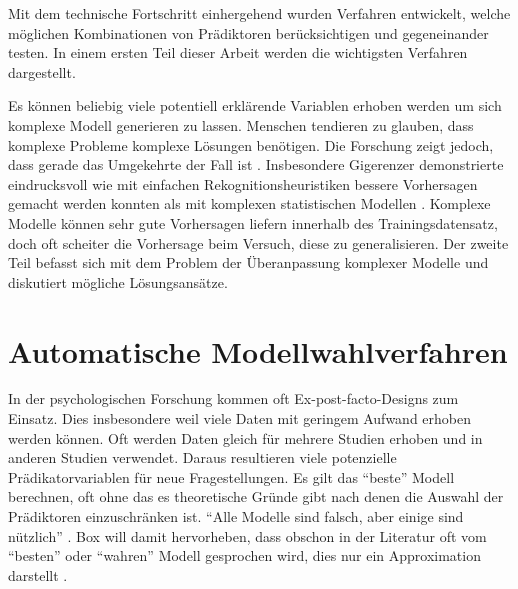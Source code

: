 \documentclass[english,12pt,doc]{apa}
\begin{document}
Mit dem technische Fortschritt einhergehend wurden Verfahren entwickelt, welche möglichen Kombinationen von Prädiktoren berücksichtigen und gegeneinander testen. 
In einem ersten Teil dieser Arbeit werden die wichtigsten Verfahren dargestellt. 

Es können beliebig viele potentiell erklärende Variablen erhoben werden um sich komplexe Modell generieren zu lassen. 
Menschen tendieren zu glauben, dass komplexe Probleme komplexe Lösungen benötigen. 
Die Forschung zeigt jedoch, dass gerade das Umgekehrte der Fall ist \cite[p.3]{armstrong2011illusions}. 
Insbesondere Gigerenzer demonstrierte eindrucksvoll wie mit einfachen Rekognitionsheuristiken bessere Vorhersagen gemacht werden konnten als mit komplexen statistischen Modellen \cite{borges1999can}. 
Komplexe Modelle können sehr gute Vorhersagen liefern innerhalb des Trainingsdatensatz, doch oft scheiter die Vorhersage beim Versuch, diese zu generalisieren. 
Der zweite Teil befasst sich mit dem Problem der Überanpassung komplexer Modelle und diskutiert mögliche Lösungsansätze.

\section{Automatische Modellwahlverfahren}
In der psychologischen Forschung kommen oft Ex-post-facto-Designs zum Einsatz. 
Dies insbesondere weil viele Daten mit geringem Aufwand erhoben werden können. Oft werden  Daten gleich für mehrere Studien erhoben und in anderen Studien verwendet. 
Daraus resultieren viele potenzielle Prädikatorvariablen für neue Fragestellungen. 
Es gilt das ``beste'' Modell berechnen, oft ohne das es theoretische Gründe gibt nach denen die Auswahl der Prädiktoren einzuschränken ist.
``Alle Modelle sind falsch, aber einige sind nützlich'' \cite[p.202]{box1979robustness}.
Box will damit hervorheben, dass obschon in der Literatur oft vom ``besten'' oder ``wahren'' Modell gesprochen wird, dies nur ein Approximation darstellt \cite[p.172]{weakliem2004introduction}. 
\end{document}
